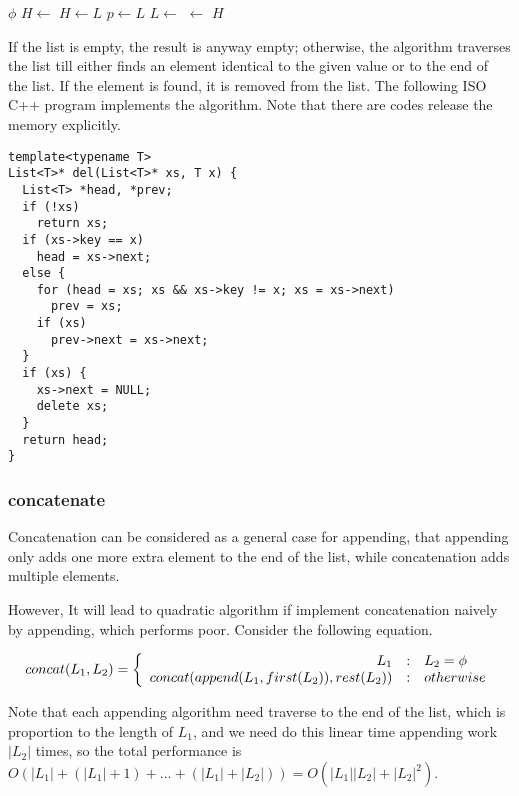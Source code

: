 \documentclass[b5paper]{article}
\begin{document}
\begin{algorithmic}[1]
   
    \State \Return $\phi$
  \EndIf
    \State $H \gets$ 
  \Else
    \State $H \gets L$
     
      \State $p \gets L$
      \State $L \gets$ 
    \EndWhile
     
      \State {} $\gets$ 
    \EndIf
  \EndIf
  \State \Return $H$
\EndFunction
\end{algorithmic}

If the list is empty, the result is anyway empty; otherwise, the algorithm traverses the list till either finds an element identical to the given value or to the
end of the list. If the element is found, it is removed from the list. The following ISO C++ program implements the algorithm. Note that there are codes release the memory explicitly.

\lstset{language=C++}
\begin{lstlisting}
template<typename T>
List<T>* del(List<T>* xs, T x) {
  List<T> *head, *prev;
  if (!xs)
    return xs;
  if (xs->key == x)
    head = xs->next;
  else {
    for (head = xs; xs && xs->key != x; xs = xs->next)
      prev = xs;
    if (xs)
      prev->next = xs->next;
  }
  if (xs) {
    xs->next = NULL;
    delete xs;
  }
  return head;
}
\end{lstlisting}

\subsubsection{concatenate}
\label{concat}
Concatenation can be considered as a general case for appending, that appending only adds one more extra element to the end of the list, while concatenation adds multiple elements.

However, It will lead to quadratic algorithm if implement concatenation naively by appending, which performs poor. Consider the
following equation.

\[
concat(L_1, L_2) = \left \{
  \begin{array}
  {r@{\quad:\quad}l}
  L_1 & L_2 = \phi \\
  concat(append(L_1, first(L_2)), rest(L_2)) & otherwise
  \end{array}
\right.
\]

Note that each appending algorithm need traverse to the end of the list, which is proportion to the length of $L_1$, and
we need do this linear time appending work $|L_2|$ times, so the total performance is $O(|L_1| + (|L_1| + 1) + ... + (|L_1| + |L_2|)) = O(|L_1||L_2| + |L_2|^2)$.
\end{document}
